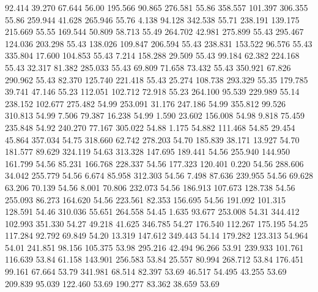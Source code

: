   92.414   39.270   67.644        56.00
 195.566   90.865  276.581        55.86
 358.557  101.397  306.355        55.86
 259.944   41.628  265.946        55.76
   4.138   94.128  342.538        55.71
 238.191  139.175  215.669        55.55
 169.544   50.809   58.713        55.49
 264.702   42.981  275.899        55.43
 295.467  124.036  203.298        55.43
 138.026  109.847  206.594        55.43
 238.831  153.522   96.576        55.43
 335.804   17.600  104.853        55.43
   7.214  158.288   29.509        55.43
  99.184   62.382  224.168        55.43
  32.317   81.382  285.033        55.43
  69.809   71.658   73.432        55.43
 350.921   67.826  290.962        55.43
  82.370  125.740  221.418        55.43
  25.274  108.738  293.329        55.35
 179.785   39.741   47.146        55.23
 112.051  102.712   72.918        55.23
 264.100   95.539  229.989        55.14
 238.152  102.677  275.482        54.99
 253.091   31.176  247.186        54.99
 355.812   99.526  310.813        54.99
   7.506   79.387   16.238        54.99
   1.590   23.602  156.008        54.98
   9.818   75.459  235.848        54.92
 240.270   77.167  305.022        54.88
   1.175   54.882  111.468        54.85
  29.454   45.864  357.034        54.75
 318.660   62.742  278.203        54.70
 185.839   38.171   13.927        54.70
 181.577   89.629  324.119        54.63
 313.328  147.695  189.441        54.56
 255.940  144.950  161.799        54.56
  85.231  166.768  228.337        54.56
 177.323  120.401    0.220        54.56
 288.606   34.042  255.779        54.56
   6.674   85.958  312.303        54.56
   7.498   87.636  239.955        54.56
  69.628   63.206   70.139        54.56
   8.001   70.806  232.073        54.56
 186.913  107.673  128.738        54.56
 255.093   86.273  164.620        54.56
 223.561   82.353  156.695        54.56
 191.092  101.315  128.591        54.46
 310.036   55.651  264.558        54.45
   1.635   93.677  253.008        54.31
 344.412  102.993  351.330        54.27
  49.218   41.625  346.785        54.27
 176.540  112.267  175.195        54.25
 117.284   92.792   69.849        54.20
  13.319  147.612  349.443        54.14
 179.282  123.313   54.964        54.01
 241.851   98.156  105.375        53.98
 295.216   42.494   96.266        53.91
 239.933  101.761  116.639        53.84
  61.158  143.901  256.583        53.84
  25.557   80.994  268.712        53.84
 176.451   99.161   67.664        53.79
 341.981   68.514   82.397        53.69
  46.517   54.495   43.255        53.69
 209.839   95.039  122.460        53.69
 190.277   83.362   38.659        53.69
